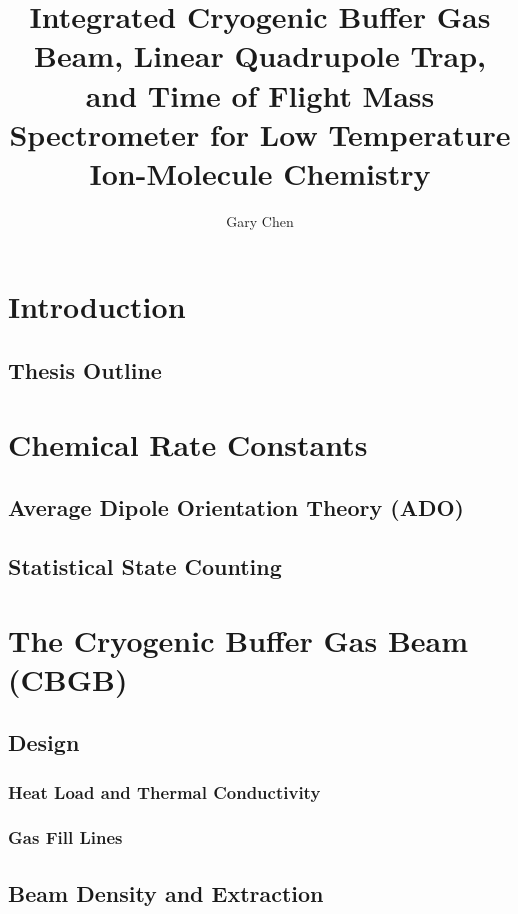 \documentclass [PhD,nolistoftables,scheader] {uclathes}
\title          {Integrated Cryogenic Buffer Gas Beam, Linear Quadrupole Trap, and Time of Flight Mass Spectrometer for Low Temperature Ion-Molecule Chemistry}
\author         {Gary Chen}
\begin{document}
\makeintropages


\chapter{Introduction}
	
	
	\section{Thesis Outline}
	
	
\chapter{Chemical Rate Constants}
	
	
	\section{Average Dipole Orientation Theory (ADO)}
	

	\section{Statistical State Counting}
	

\chapter{The Cryogenic Buffer Gas Beam (CBGB)}


	\section{Design}
	
	
		\subsection{Heat Load and Thermal Conductivity}
		
		
		\subsection{Gas Fill Lines}
		
	
	\section{Beam Density and Extraction} \label{sec: beam density}
	
	
\end{document}
